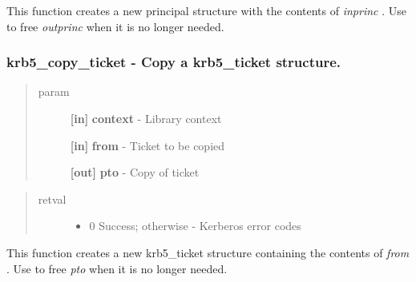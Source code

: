 \documentclass[letterpaper,10pt,english]{sphinxmanual}
\begin{document}
This function creates a new principal structure with the contents of \emph{inprinc} . Use {\hyperref[appdev/refs/api/krb5_free_principal:c.krb5_free_principal]{}} to free \emph{outprinc} when it is no longer needed.


\subsubsection{krb5\_copy\_ticket -  Copy a krb5\_ticket structure.}
\label{appdev/refs/api/krb5_copy_ticket:krb5-copy-ticket-copy-a-krb5-ticket-structure}\label{appdev/refs/api/krb5_copy_ticket::doc}

\begin{fulllineitems}
\label{appdev/refs/api/krb5_copy_ticket:c.krb5_copy_ticket}
\end{fulllineitems}

\begin{quote}\begin{description}
\item[{param}] \leavevmode
\textbf{{[}in{]}} \textbf{context} - Library context

\textbf{{[}in{]}} \textbf{from} - Ticket to be copied

\textbf{{[}out{]}} \textbf{pto} - Copy of ticket

\end{description}\end{quote}
\begin{quote}\begin{description}
\item[{retval}] \leavevmode\begin{itemize}
\item {} 
0   Success; otherwise - Kerberos error codes

\end{itemize}

\end{description}\end{quote}

This function creates a new krb5\_ticket structure containing the contents of \emph{from} . Use {\hyperref[appdev/refs/api/krb5_free_ticket:c.krb5_free_ticket]{}} to free \emph{pto} when it is no longer needed.
\end{document}
